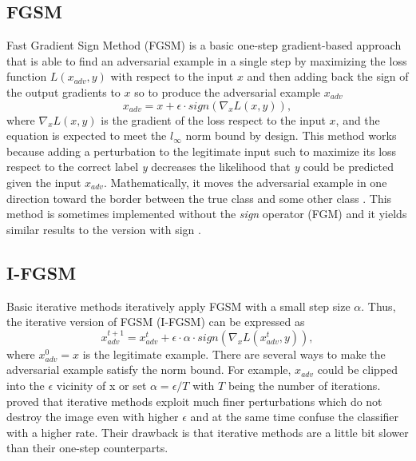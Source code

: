 \subsection{FGSM}
Fast Gradient Sign Method (FGSM) \cite{goodfellow2014explaining} is a basic one-step gradient-based approach that is able to find an adversarial example in a single step by maximizing the loss function \( L(x_{adv}, y)\) with respect to the input \(x\) and then adding back the sign of the output gradients to \(x\) so to produce the adversarial example \(x_{adv}\)
\begin{equation}
x_{adv}=x+\epsilon \cdot sign(\nabla_x L(x, y)),
\end{equation}
where \(\nabla_x L(x, y)\) is the gradient of the loss respect to the input \(x\), and the equation is expected to meet the \(l_{\infty}\) norm bound by design. This method works because adding a perturbation to the legitimate input such to maximize its loss respect to the correct label \textit{y} decreases the likelihood that \textit{y} could be predicted given the input \(x_{adv}\). Mathematically, it moves the adversarial example in one direction toward the border between the true class and some other class \cite{dong2017boosting}. This method is sometimes implemented without the {\it sign} operator (FGM) and it yields similar results to the version with sign \cite{agarwal2018explainable}.

\subsection{I-FGSM}
Basic iterative methods \cite{kurakin2016adversarial} iteratively apply FGSM with a small step size \(\alpha\). Thus, the iterative version of FGSM (I-FGSM) can be expressed as
\begin{equation}
x_{adv}^{t+1}=x_{adv}^{t}+\epsilon \cdot \alpha \cdot sign(\nabla_x L(x_{adv}^{t}, y)),
\end{equation}
where \(x_{adv}^{0}=x\) is the legitimate example. There are several ways to make the adversarial example satisfy the norm bound. For example, \(x_{adv}\) could be clipped into the \(\epsilon\) vicinity of x or set \(\alpha=\epsilon/T\) with \(T\) being the number of iterations. \cite{kurakin2016adversarial} proved that iterative methods exploit much finer perturbations which do not destroy the image even with higher \(\epsilon\) and at the same time confuse the classifier with a higher rate. Their drawback is that iterative methods are a little bit slower than their one-step counterparts.

